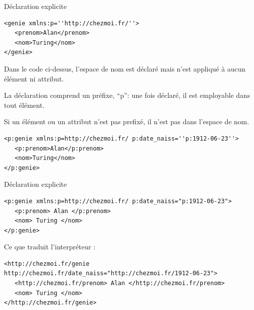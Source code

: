 \begin{frame}[containsverbatim]{Déclaration explicite}

\begin{lstlisting}[caption=Déclaration explicite d'un espace de nom]
<genie xmlns:p=''http://chezmoi.fr/''>
   <prenom>Alan</prenom>
   <nom>Turing</nom>
</genie>
\end{lstlisting}
Dans le code ci-dessus, l'espace de nom est \alert{déclaré} mais n'est \alert{appliqué} à aucun élément ni attribut. \\

\vfill

La déclaration comprend un \alert{préfixe}, ``\alert{p}'': une fois déclaré, il est employable dans tout élément. 

\vfill
Si un élément ou un attribut n'est pas prefixé, il n'est pas dans l'espace de nom.\\

\begin{lstlisting}[caption=Déclaration explicite et application d'un espace de nom]
<p:genie xmlns:p=http://chezmoi.fr/ p:date_naiss=''p:1912-06-23''>
   <p:prenom>Alan</p:prenom>
   <nom>Turing</nom>
</p:genie>
\end{lstlisting}


\end{frame}


\begin{frame}[containsverbatim]{Déclaration explicite}

\begin{lstlisting}
<p:genie xmlns:p=http://chezmoi.fr/ p:date_naiss="p:1912-06-23">
   <p:prenom> Alan </p:prenom>
   <nom> Turing </nom>
</p:genie>
\end{lstlisting}

Ce que traduit l'interpréteur :

\begin{lstlisting}
<http://chezmoi.fr/genie http://chezmoi.fr/date_naiss="http://chezmoi.fr/1912-06-23">
   <http://chezmoi.fr/prenom> Alan </http://chezmoi.fr/prenom>
   <nom> Turing </nom>
</http://chezmoi.fr/genie>

\end{lstlisting}
\end{frame}

